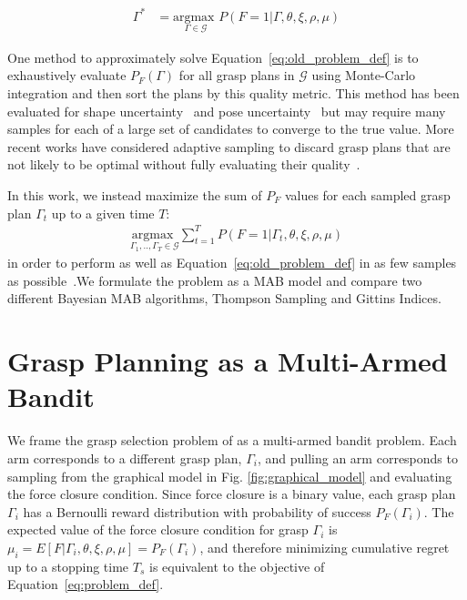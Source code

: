 \documentclass[journal,transmag]{IEEEtran}%
\newcommand{\mG}{\mathcal{G}}
\begin{document}
\vspace{-2ex}
\begin{align}
\Gamma^* &= \underset{\Gamma \in \mG}{\text{argmax }} P\left( F = 1 | \Gamma, \theta, \xi, \rho, \mu \right) \label{eq:old_problem_def}
\end{align}



One method to approximately solve Equation~\ref{eq:old_problem_def} is to exhaustively evaluate $P_F(\Gamma)$ for all grasp plans in $\mG$ using Monte-Carlo integration and then sort the plans by this quality metric.
This method has been evaluated for shape uncertainty~\cite{christopoulos2007handling, kehoe2012estimating} and pose uncertainty~\cite{weisz2012pose} but may require many samples for each of a large set of candidates to converge to the true value.
More recent works have considered adaptive sampling to discard grasp plans that are not likely to be optimal without fully evaluating their quality~\cite{kehoe2012toward}.

In this work, we instead maximize the sum of $P_F$ values for each sampled grasp plan $\Gamma_t$ up to a given time $T$:
\begin{align}
    \underset{\Gamma_1, .., \Gamma_T \in \mG}{\text{argmax }} \sum \limits_{t=1}^T P\left( F = 1 | \Gamma_t, \theta, \xi, \rho, \mu \right)   \label{eq:problem_def}
\end{align}
\noindent in order to perform as well as Equation~\ref{eq:old_problem_def} in as few samples as possible~\cite{srinivas2009gaussian}.We formulate the problem as a MAB model and compare two different Bayesian MAB algorithms, Thompson Sampling and Gittins Indices.

\section{Grasp Planning as a Multi-Armed Bandit}
We frame the grasp selection problem of  as a multi-armed bandit problem.
Each arm corresponds to a different grasp plan, $\Gamma_i$, and pulling an arm corresponds to sampling from the graphical model in Fig. \ref{fig:graphical_model} and evaluating the force closure condition.
Since force closure is a binary value, each grasp plan $\Gamma_i$ has a Bernoulli reward distribution with probability of success $P_F(\Gamma_i)$.
The expected value of the force closure condition for grasp $\Gamma_i$ is $\mu_i = E \left[ F | \Gamma_i, \theta, \xi, \rho, \mu \right] = P_F(\Gamma_i)$, and therefore minimizing cumulative regret up to a stopping time $T_s$ is equivalent to the objective of Equation~\ref{eq:problem_def}.
\end{document}
